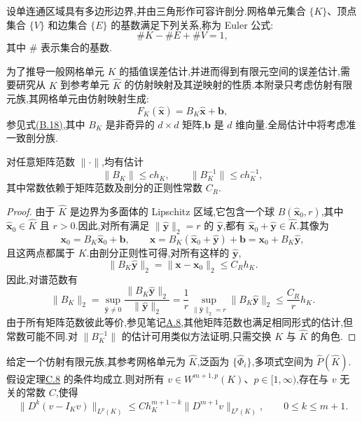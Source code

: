 \begin{note}\label{note:appendix-c-10}
设单连通区域具有多边形边界,并由三角形作可容许剖分.网格单元集合 $\{K\}$、顶点集合 $\{V\}$ 和边集合 $\{E\}$ 的基数满足下列关系,称为 Euler 公式:
\[
 \#K-\#E+\#V=1,
\]
其中 $\#$ 表示集合的基数.
\end{note}

\begin{note}[参考映射与剖分的假设]\label{note:appendix-c-11}
为了推导一般网格单元 $K$ 的插值误差估计,并进而得到有限元空间的误差估计,需要研究从 $K$ 到参考单元 $\widehat K$ 的仿射映射及其逆映射的性质.本附录只考虑仿射有限元族,其网格单元由仿射映射生成:
\[
 F_K(\widehat{\bm x})=B_K\widehat{\bm x}+\bm b,
\]
参见式\hyperref[eq:appendix-b-18]{(B.18)},其中 $B_K$ 是非奇异的 $d\times d$ 矩阵,$\bm b$ 是 $d$ 维向量.全局估计中将考虑准一致剖分族.
\end{note}

\begin{lemma}[矩阵范数估计]\label{lem:appendix-c-12}
对任意矩阵范数 $\|\cdot\|$,均有估计
\begin{equation}\label{eq:appendix-c-6}
 \|B_K\|\le ch_K,\qquad
 \|B_K^{-1}\|\le ch_K^{-1},
\end{equation}
其中常数依赖于矩阵范数及剖分的正则性常数 $C_R$.
\end{lemma}

\begin{proof}
由于 $\widehat K$ 是边界为多面体的 Lipschitz 区域,它包含一个球
$B(\widehat{\bm x}_0,r)$,其中 $\widehat{\bm x}_0\in\widehat K$ 且 $r>0$.因此,对所有满足 $\|\widehat{\bm y}\|_2=r$ 的 $\widehat{\bm y}$,都有 $\widehat{\bm x}_0+\widehat{\bm y}\in\widehat K$.其像为
\[
 \bm x_0=B_K\widehat{\bm x}_0+\bm b,\qquad
 \bm x=B_K(\widehat{\bm x}_0+\widehat{\bm y})+\bm b
 =\bm x_0+B_K\widehat{\bm y},
\]
且这两点都属于 $K$.由剖分正则性可得,对所有这样的 $\widehat{\bm y}$,
\[
 \|B_K\widehat{\bm y}\|_2=\|\bm x-\bm x_0\|_2
 \le C_Rh_K.
\]
因此,对谱范数有
\[
 \|B_K\|_2
 =\sup_{\widehat{\bm y}\ne0}
   \frac{\|B_K\widehat{\bm y}\|_2}{\|\widehat{\bm y}\|_2}
 =\frac1r\sup_{\|\widehat{\bm y}\|_2=r}
   \|B_K\widehat{\bm y}\|_2
 \le\frac{C_R}{r}h_K.
\]
由于所有矩阵范数彼此等价,参见笔记\hyperref[note:appendix-a-8]{A.8},其他矩阵范数也满足相同形式的估计,但常数可能不同.对 $\|B_K^{-1}\|$ 的估计可用类似方法证明,只需交换 $K$ 与 $\widehat K$ 的角色.
\end{proof}

\begin{theorem}[局部插值估计]\label{thm:appendix-c-13}
给定一个仿射有限元族,其参考网格单元为 $\widehat K$,泛函为
$\{\widehat\Phi_i\}$,多项式空间为 $\widehat P(\widehat K)$.假设定理\hyperref[thm:appendix-c-8]{C.8} 的条件均成立.则对所有
$v\in W^{m+1,p}(K)$、$p\in[1,\infty)$,存在与 $v$ 无关的常数 $C$,使得
\begin{equation}\label{eq:appendix-c-7}
 \|D^k(v-I_Kv)\|_{L^p(K)}
 \le Ch_K^{m+1-k}\|D^{m+1}v\|_{L^p(K)},
 \qquad 0\le k\le m+1.
\end{equation}
\end{theorem}

